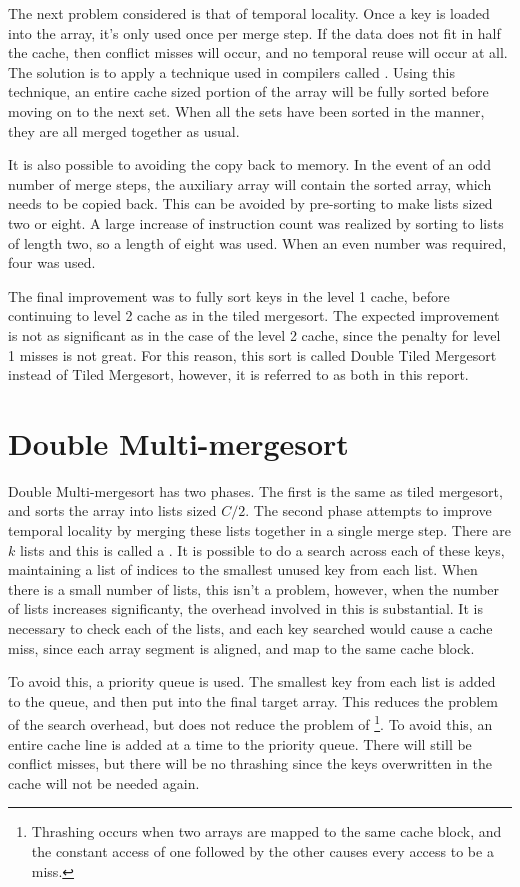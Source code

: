 The next problem considered is that of temporal locality. Once a key is loaded
into the array, it's only used once per merge step. If the data does not fit in
half the cache, then conflict misses will occur, and no temporal reuse will
occur at all. The solution is to apply a technique used in compilers called
. Using this technique, an entire cache sized portion of the array will
be fully sorted before moving on to the next set. When all the sets have been
sorted in the manner, they are all merged together as usual.

It is also possible to avoiding the copy back to memory. In the event of an odd
number of merge steps, the auxiliary array will contain the sorted array, which
needs to be copied back. This can be avoided by pre-sorting to make lists sized
two or eight. A large increase of instruction count was realized by sorting to
lists of length two, so a length of eight was used. When an even number was
required, four was used.

The final improvement was to fully sort keys in the level 1 cache, before
continuing to level 2 cache as in the tiled mergesort. The expected improvement
is not as significant as in the case of the level 2 cache, since the penalty
for level 1 misses is not great. For this reason, this sort is called Double
Tiled Mergesort instead of Tiled Mergesort, however, it is referred to as both
in this report.

\section{Double Multi-mergesort}

Double Multi-mergesort has two phases. The first is the same as tiled mergesort, and
sorts the array into lists sized $C/2$. The second phase attempts to improve
temporal locality by merging these lists together in a single merge step. There
are $k$ lists and this is called a . It is possible to do a
search across each of these keys, maintaining a list of indices to the smallest
unused key from each list. When there is a small number of lists, this isn't a
problem, however, when the number of lists increases significanty, the overhead
involved in this is substantial. It is necessary to check each of the lists, and
each key searched would cause a cache miss, since each array segment is aligned,
and map to the same cache block.

To avoid this, a priority queue is used. The smallest key from each list is
added to the queue, and then put into the final target array. This reduces the
problem of the search overhead, but does not reduce the problem of
\footnote{Thrashing occurs when two arrays are mapped to the same
cache block, and the constant access of one followed by the other causes every
access to be a miss.}.  To avoid this, an entire cache line is added at a time
to the priority queue. There will still be conflict misses, but there will be no
thrashing since the keys overwritten in the cache will not be needed again.

